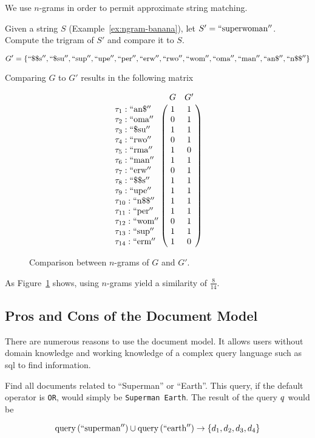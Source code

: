 		We use $n$-grams in order to permit approximate string matching.
		
		\begin{ex}
		\label{ex:n-gram-comparison}
			Given a string $S$ (Example~\ref{ex:ngram-banana}), let $S' = \mathrm{``superwoman''}$.  Compute the trigram of $S'$ and compare it to $S$.
			
			$$
				G' = \left\{
					\mathrm{``\char"24\char"24s''},
					\mathrm{``\char"24su''},
					\mathrm{``sup''},
					\mathrm{``upe''},
					\mathrm{``per''},
					\mathrm{``erw''},
					\mathrm{``rwo''},
					\mathrm{``wom''},
					\mathrm{``oma''},
					\mathrm{``man''},
					\mathrm{``an\char"24''},
					\mathrm{``n\char"24\char"24''}
				\right\}
			$$
			
			Comparing $G$ to $G'$ results in the following matrix
			
			\begin{figure}[!ht]
				$$
					\bordermatrix{
						~ & G & G' \cr
						\term_1 : \mathrm{``an\char"24''} & 1 & 1 \cr
						\term_2 : \mathrm{``oma''} & 0 & 1 \cr
						\term_3 : \mathrm{``\char"24su''} & 1 & 1 \cr
						\term_4 : \mathrm{``rwo''} & 0 & 1 \cr
						\term_5 : \mathrm{``rma''} & 1 & 0 \cr
						\term_6 : \mathrm{``man''} & 1 & 1 \cr
						\term_7 : \mathrm{``erw''} & 0 & 1 \cr
						\term_8 : \mathrm{``\char"24\char"24s''} & 1 & 1 \cr
						\term_9 : \mathrm{``upe''} & 1 & 1 \cr
						\term_{10} : \mathrm{``n\char"24\char"24''} & 1 & 1 \cr
						\term_{11} : \mathrm{``per''} & 1 & 1 \cr
						\term_{12} : \mathrm{``wom''} & 0 & 1 \cr
						\term_{13} : \mathrm{``sup''} & 1 & 1 \cr
						\term_{14} : \mathrm{``erm''} & 1 & 0 \cr
					}
				$$
				
				\caption{Comparison between $n$-grams of $G$ and $G'$.}
				\label{fig:n-gram-misspelling-comparison}
			\end{figure}
			
			As Figure~\ref{fig:n-gram-misspelling-comparison} shows, using $n$-grams yield a similarity of $\frac{8}{14}$.
		\end{ex}
			
	\subsection{Pros and Cons of the Document Model}
		There are numerous reasons to use the document model.  It allows users without domain knowledge and working knowledge of a complex query language such as \gls{sql} to find information.
		
		\begin{ex}
			Find all documents related to ``Superman'' or ``Earth''.  This query, if the default operator is \texttt{OR}, would simply be \texttt{Superman Earth}.  The result of the query $q$ would be
			
			$$\operatorname{query}\left(\mathrm{``superman''}\right) \cup \operatorname{query}\left(\mathrm{``earth''}\right) \rightarrow \left\{d_1, d_2, d_3, d_4\right\}$$
		\end{ex}
		
